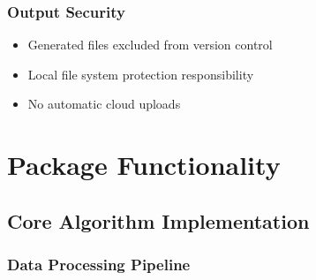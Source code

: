 \documentclass[
  11pt,
]{article}
\providecommand{\tightlist}{%
  \setlength{\itemsep}{0pt}\setlength{\parskip}{0pt}}
\begin{document}
\subsubsection{Output Security}\label{output-security}

\begin{itemize}
\tightlist
\item
  Generated files excluded from version control
\item
  Local file system protection responsibility
\item
  No automatic cloud uploads
\end{itemize}

\newpage

\section{Package Functionality}\label{package-functionality}

\subsection{Core Algorithm
Implementation}\label{core-algorithm-implementation}

\subsubsection{Data Processing Pipeline}\label{data-processing-pipeline}
\end{document}

